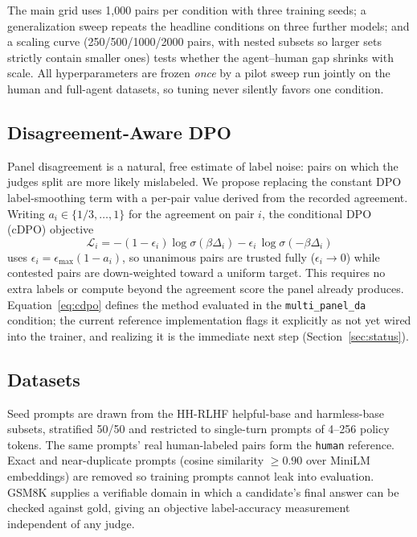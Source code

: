 \documentclass[conference]{IEEEtran}
\begin{document}
The main grid uses 1{,}000 pairs per condition with three training seeds; a
generalization sweep repeats the headline conditions on three further models; and
a scaling curve (250/500/1000/2000 pairs, with nested subsets so larger sets
strictly contain smaller ones) tests whether the agent--human gap shrinks with
scale. All hyperparameters are frozen \emph{once} by a pilot sweep run jointly on
the human and full-agent datasets, so tuning never silently favors one condition.

\subsection{Disagreement-Aware DPO}
Panel disagreement is a natural, free estimate of label noise: pairs on which the
judges split are more likely mislabeled. We propose replacing the constant DPO
label-smoothing term with a per-pair value derived from the recorded agreement.
Writing $a_i\in\{1/3,\dots,1\}$ for the agreement on pair $i$, the conditional DPO
(cDPO) objective
\begin{equation}
\mathcal{L}_i = -(1-\epsilon_i)\log\sigma(\beta\Delta_i)
               - \epsilon_i\,\log\sigma(-\beta\Delta_i)
\label{eq:cdpo}
\end{equation}
uses $\epsilon_i = \epsilon_{\max}(1-a_i)$, so unanimous pairs are trusted fully
($\epsilon_i\!\to\!0$) while contested pairs are down-weighted toward a uniform
target. This requires no extra labels or compute beyond the agreement score the
panel already produces. Equation~\eqref{eq:cdpo} defines the method evaluated in
the \texttt{multi\_panel\_da} condition; the current reference implementation
flags it explicitly as not yet wired into the trainer, and realizing it is the
immediate next step (Section~\ref{sec:status}).

\subsection{Datasets}
Seed prompts are drawn from the HH-RLHF helpful-base and harmless-base subsets,
stratified 50/50 and restricted to single-turn prompts of 4--256 policy tokens.
The same prompts' real human-labeled pairs form the \texttt{human} reference.
Exact and near-duplicate prompts (cosine similarity $\geq 0.90$ over MiniLM
embeddings) are removed so training prompts cannot leak into evaluation. GSM8K
supplies a verifiable domain in which a candidate's final answer can be checked
against gold, giving an objective label-accuracy measurement independent of any
judge.
\end{document}
